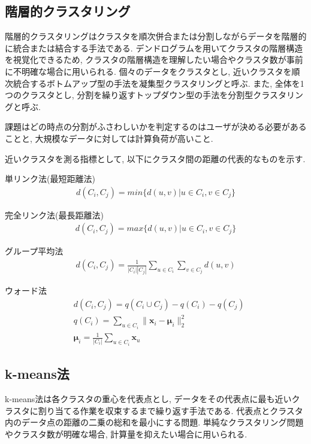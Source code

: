 \documentclass[dvipdfmx, 10pt]{jsarticle}
\begin{document}
\subsection*{階層的クラスタリング}
階層的クラスタリングはクラスタを順次併合または分割しながらデータを階層的に統合または結合する手法である. 
デンドログラムを用いてクラスタの階層構造を視覚化できるため, 
クラスタの階層構造を理解したい場合やクラスタ数が事前に不明確な場合に用いられる. 
個々のデータをクラスタとし, 近いクラスタを順次統合するボトムアップ型の手法を凝集型クラスタリングと呼ぶ. 
また, 全体を1つのクラスタとし, 分割を繰り返すトップダウン型の手法を分割型クラスタリングと呼ぶ. 

課題はどの時点の分割がふさわしいかを判定するのはユーザが決める必要があることと, 大規模なデータに対しては計算負荷が高いこと. 

近いクラスタを測る指標として, 以下にクラスタ間の距離の代表的なものを示す. 

\begin{oframed}
    単リンク法(最短距離法)
    \begin{align*}
        d(C_i, C_j) = min\{d(u,v) | u \in C_i, v \in C_j\}
    \end{align*}

    完全リンク法(最長距離法)
    \begin{align*}
        d(C_i, C_j) = max\{d(u,v) | u \in C_i, v \in C_j\}
    \end{align*}

    グループ平均法
    \begin{align*}
        d(C_i, C_j) = \frac{1}{|C_i||C_j|} \sum_{u \in C_i} \sum_{v \in C_j} d(u,v) 
    \end{align*}

    ウォード法
    \begin{align*}
        & d(C_i, C_j) = q(C_i \cup C_j) - q(C_i) - q(C_j) \\
        & q(C_i) = \sum_{u \in C_i} \|\mathbf{x}_i - \mathbf{\mu}_i\|_2^2 \\
        & \mathbf{\mu}_i = \frac{1}{|C_i|} \sum_{u \in C_i} \mathbf{x}_u
    \end{align*}
\end{oframed}

\subsection*{k-means法}
k-means法は各クラスタの重心を代表点とし, データをその代表点に最も近いクラスタに割り当てる作業を収束するまで繰り返す手法である. 
代表点とクラスタ内のデータ点の距離の二乗の総和を最小にする問題. 
単純なクラスタリング問題やクラスタ数が明確な場合, 計算量を抑えたい場合に用いられる. 
\end{document}
